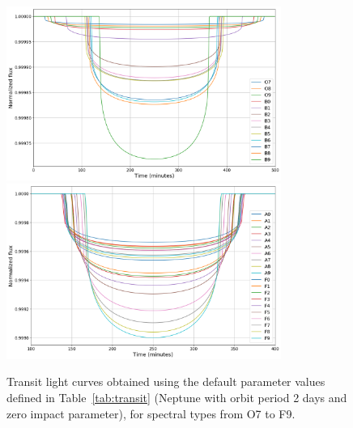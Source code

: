 \documentclass[11pt]{article}      %
\begin{document}
\begin{figure}[hbtp]
  \begin{center}
    {\includegraphics[width=0.8\textwidth]{limbDarkening_OB.png}}
    {\includegraphics[width=0.8\textwidth]{limbDarkening_AF.png}}
    \caption{Transit light curves obtained using the default parameter values defined in Table~\ref{tab:transit} (Neptune with orbit period 2 days and zero impact parameter), for spectral types from O7 to F9.}
    \label{fig:incidentLightCurve1}
  \end{center}
\end{figure}
\end{document}

